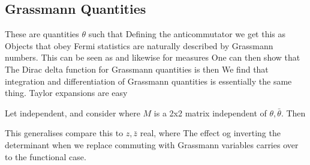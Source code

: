 \documentclass{article}
\begin{document}
\subsection{Grassmann Quantities}
These are quantities $\theta$ such that 
Defining the anticommutator we get this as 
Objects that obey Fermi statistics are naturally described by Grassmann numbers. This can be seen as 
and likewise for measures 
One can then show that 
The Dirac delta function for Grassmann quantities is then  
\eq{
\delta(\theta) = \theta
}
We find that integration and differentiation of Grassmann quantities is essentially the same thing. Taylor expansions are easy 

\begin{example}
Let 
independent, and consider 
where $M$ is a 2x2 matrix independent of $\theta,\bar{\theta}$. Then 
\end{example}

This generalises 
compare this to $z, \bar{z}$ real, where 
The effect og inverting the determinant when we replace commuting with Grassmann variables carries over to the functional case. 
\end{document}

